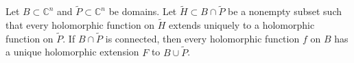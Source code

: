 Let $B \subset \mathbb{C}^n$ and $\tilde{P} \subset \mathbb{C}^n$ be domains. Let $\tilde{H} \subset B \cap \tilde{P}$ be a nonempty subset such that every holomorphic function on $\tilde{H}$ extends uniquely to a holomorphic function on $\tilde{P}$. If $B \cap \tilde{P}$ is connected, then every holomorphic function $f$ on $B$ has a unique holomorphic extension $F$ to $B \cup \tilde{P}$.
